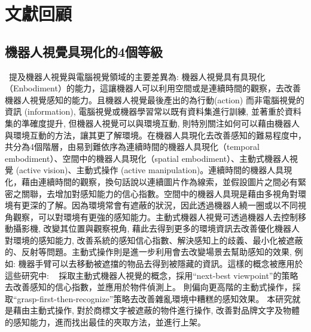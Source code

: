 \chapter{文獻回顧}
\label{chapter:relate-work}

\section{機器人視覺具現化的4個等級}
~\cite{sunderhauf2018limits}提及機器人視覺與電腦視覺領域的主要差異為: 機器人視覺具有具現化（Enbodiment）的能力，這讓機器人可以利用空間或是連續時間的觀察，去改善機器人視覺感知的能力。且機器人視覺最後產出的為行動(action) 而非電腦視覺的資訊 (information), 電腦視覺或機器學習常以既有資料集進行訓練, 並著重於資料集的準確度提升, 但機器人視覺可以與環境互動, 則特別關注如何可以藉由機器人與環境互動的方法，讓其更了解環境。在機器人具現化去改善感知的難易程度中，共分為4個階層，由易到難依序為連續時間的機器人具現化（temporal embodiment）、空間中的機器人具現化（spatial embodiment）、主動式機器人視覺 (active vision)、主動式操作 (active manipulation)。連續時間的機器人具現化，藉由連續時間的觀察，換句話說以連續圖片作為線索，並假設圖片之間必有緊密之關聯，去增加對感知能力的信心指數。空間中的機器人具現是藉由多視角對環境有更深的了解。因為環境常會有遮蔽的狀況，因此透過機器人繞一圈或以不同視角觀察，可以對環境有更強的感知能力。主動式機器人視覺可透過機器人去控制移動攝影機, 改變其位置與觀察視角, 藉此去得到更多的環境資訊去改善優化機器人對環境的感知能力, 改善系統的感知信心指數、解決感知上的歧義、最小化被遮蔽的、反射等問題。主動式操作則是進一步利用會去改變場景去幫助感知的效果, 例如: 機器手臂可以去移動被遮擋的物品去得到被隱藏的資訊。這樣的概念被應用於這些研究中: ~\cite{atanasov2014nonmyopic} \cite{doumanoglou2016recovering} \cite{malmir2017deep}採取主動式機器人視覺的概念，採用``next-best viewpoint''的策略去改善感知的信心指數，並應用於物件偵測上。
 \cite{zeng2018robotic} 則偏向更高階的主動式操作，採取``grasp-first-then-recognize''策略去改善雜亂環境中糟糕的感知效果。
本研究就是藉由主動式操作, 對於商標文字被遮蔽的物件進行操作, 改善對品牌文字及物體的感知能力，進而找出最佳的夾取方法，並進行上架。

